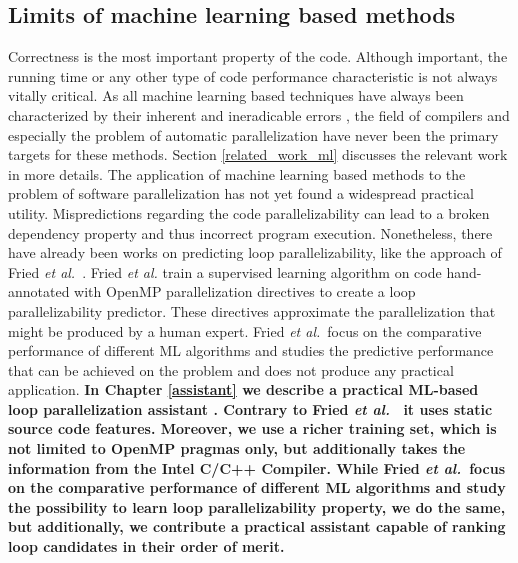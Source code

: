 \subsection{Limits of machine learning based methods}
\label{background_challenges_ml}
\quad Correctness is the most important property of the code. Although important, the running time or any other type of code performance characteristic is not always vitally critical. As all machine learning based techniques have always been characterized by their inherent and ineradicable errors \cite{James:2013:ISL:2517747}, the field of compilers and especially the problem of automatic parallelization have never been the primary targets for these methods. Section \ref{related_work_ml} discusses the relevant work in more details. The application of machine learning based methods to the problem of software parallelization has not yet found a widespread practical utility. Mispredictions regarding the code parallelizability can lead to a broken dependency property and thus incorrect program execution. Nonetheless, there have already been works on predicting loop parallelizability, like the approach of Fried \emph{et al.}~\cite{fried_ea:2013:icmla}. Fried \emph{et al.} train a supervised learning algorithm on code hand-annotated with OpenMP parallelization directives to create a loop parallelizability predictor. These directives approximate the parallelization that might be produced by a human expert. Fried \emph{et al.}~focus on the comparative performance of different ML algorithms and studies the predictive performance that can be achieved on the problem and does not produce any practical application.\newline\null
\textbf{\quad In Chapter \ref{assistant} we describe a practical ML-based loop parallelization assistant \cite{assistant-aiseps}. Contrary to Fried \emph{et al.}~\cite{fried_ea:2013:icmla} it uses static source code features. Moreover, we use a richer training set, which is not limited to OpenMP pragmas only, but additionally takes the information from the Intel C/C++ Compiler. While Fried \emph{et al.}~focus on the comparative performance of different ML algorithms and study the possibility to learn loop parallelizability property, we do the same, but
additionally, we contribute a practical assistant capable of
ranking loop candidates in their order of merit.}
